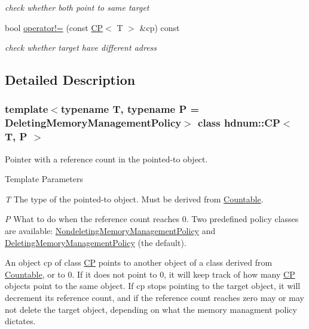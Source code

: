 \begin{DoxyCompactItemize}
\begin{DoxyCompactList}\small\item\em check whether both point to same target \item\end{DoxyCompactList}\item 
\hypertarget{classhdnum_1_1CP_ac27eb29e95f1008def9303b31a2e0822}{
bool \hyperlink{classhdnum_1_1CP_ac27eb29e95f1008def9303b31a2e0822}{operator!=} (const \hyperlink{classhdnum_1_1CP}{CP}$<$ T $>$ \&cp) const }
\label{classhdnum_1_1CP_ac27eb29e95f1008def9303b31a2e0822}

\begin{DoxyCompactList}\small\item\em check whether target have different adress \item\end{DoxyCompactList}\end{DoxyCompactItemize}


\subsection{Detailed Description}
\subsubsection*{template$<$typename T, typename P = DeletingMemoryManagementPolicy$>$ class hdnum::CP$<$ T, P $>$}

Pointer with a reference count in the pointed-\/to object. 
\begin{DoxyTemplParams}{Template Parameters}
\item[{\em T}]The type of the pointed-\/to object. Must be derived from \hyperlink{classhdnum_1_1Countable}{Countable}. \item[{\em P}]What to do when the reference count reaches 0. Two predefined policy classes are available: \hyperlink{classhdnum_1_1NondeletingMemoryManagementPolicy}{NondeletingMemoryManagementPolicy} and \hyperlink{classhdnum_1_1DeletingMemoryManagementPolicy}{DeletingMemoryManagementPolicy} (the default).\end{DoxyTemplParams}
An object cp of class \hyperlink{classhdnum_1_1CP}{CP} points to another object of a class derived from \hyperlink{classhdnum_1_1Countable}{Countable}, or to 0. If it does not point to 0, it will keep track of how many \hyperlink{classhdnum_1_1CP}{CP} objects point to the same object. If cp stops pointing to the target object, it will decrement its reference count, and if the reference count reaches zero may or may not delete the target object, depending on what the memory managment policy dictates.

